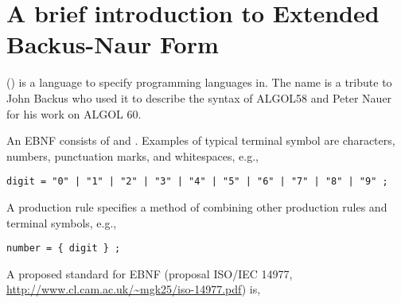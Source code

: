 \chapter{A brief introduction to Extended Backus-Naur Form}
\label{sec:ebnf}
 () is a language to specify programming languages in. The name is a tribute to John Backus who used it to describe the syntax of ALGOL58 and Peter Nauer for his work on ALGOL 60.

An EBNF consists of  and . Examples of typical terminal symbol are characters, numbers, punctuation marks, and whitespaces, e.g.,
\begin{lstlisting}[language=EBNF]
digit = "0" | "1" | "2" | "3" | "4" | "5" | "6" | "7" | "8" | "9" ;
\end{lstlisting}
A production rule specifies a method of combining other production rules and terminal symbols, e.g.,
\begin{lstlisting}[language=EBNF]
number = { digit } ;
\end{lstlisting}
A proposed standard for EBNF (proposal ISO/IEC 14977, \url{http://www.cl.cam.ac.uk/~mgk25/iso-14977.pdf}) is,
